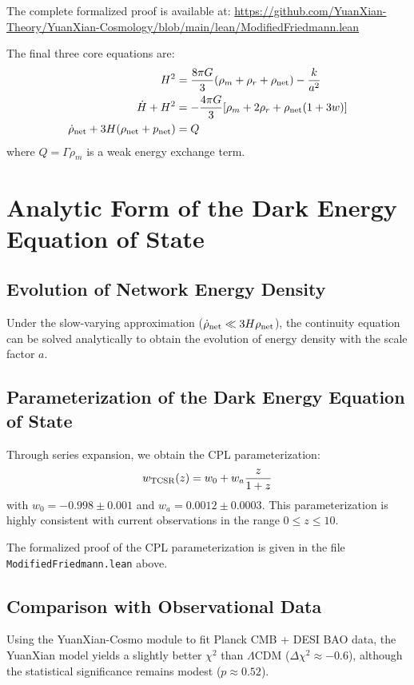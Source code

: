\documentclass[12pt,a4paper]{article}
\begin{document}
The complete formalized proof is available at:
\url{https://github.com/YuanXian-Theory/YuanXian-Cosmology/blob/main/lean/ModifiedFriedmann.lean}

The final three core equations are:
\begin{align}
H^2 &= \frac{8\pi G}{3} (\rho_m + \rho_r + \rho_{\rm net}) - \frac{k}{a^2} \label{eq:mod-fried1} \\
\dot{H} + H^2 &= -\frac{4\pi G}{3} [\rho_m + 2\rho_r + \rho_{\rm net}(1 + 3w)] \label{eq:mod-fried2} \\
\dot{\rho}_{\rm net} + 3H(\rho_{\rm net} + p_{\rm net}) &= Q \label{eq:continuity}
\end{align}
where $Q = \Gamma \rho_m$ is a weak energy exchange term.

\section{Analytic Form of the Dark Energy Equation of State}

\subsection{Evolution of Network Energy Density}

Under the slow-varying approximation ($\dot{\rho}_{\rm net} \ll 3H\rho_{\rm net}$), the continuity equation can be solved analytically to obtain the evolution of energy density with the scale factor $a$.

\subsection{Parameterization of the Dark Energy Equation of State}

Through series expansion, we obtain the CPL parameterization:
\[
w_{\rm TCSR}(z) = w_0 + w_a \frac{z}{1+z}
\]
with $w_0 = -0.998 \pm 0.001$ and $w_a = 0.0012 \pm 0.0003$. This parameterization is highly consistent with current observations in the range $0 \leq z \leq 10$.

The formalized proof of the CPL parameterization is given in the file \texttt{ModifiedFriedmann.lean} above.

\subsection{Comparison with Observational Data}

Using the YuanXian-Cosmo module to fit Planck CMB + DESI BAO data, the YuanXian model yields a slightly better $\chi^2$ than $\Lambda$CDM ($\Delta\chi^2 \approx -0.6$), although the statistical significance remains modest ($p \approx 0.52$).
\end{document}
